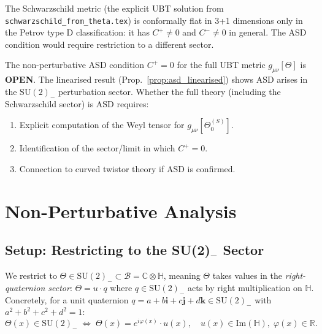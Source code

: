 \documentclass[11pt,a4paper]{article}
\theoremstyle{definition}
\theoremstyle{remark}
\begin{document}
The Schwarzschild metric (the explicit UBT solution from
\texttt{schwarzschild\_from\_theta.tex}) is conformally flat in 3+1
dimensions only in the Petrov type D classification: it has $C^+ \neq 0$
and $C^- \neq 0$ in general.  The ASD condition would require restriction
to a different sector.

\begin{tcolorbox}[colback=yellow!10!white,colframe=orange!75!black,
                  title={Open: Non-Perturbative ASD}]
The non-perturbative ASD condition $C^+ = 0$ for the full UBT metric
$g_{\mu\nu}[\Theta]$ is \textbf{OPEN}.  The linearised result
(Prop.~\ref{prop:asd_linearised}) shows ASD arises in the
$\mathrm{SU}(2)_-$ perturbation sector.  Whether the full theory
(including the Schwarzschild sector) is ASD requires:
\begin{enumerate}
  \item Explicit computation of the Weyl tensor for $g_{\mu\nu}[\Theta_0^{(S)}]$.
  \item Identification of the sector/limit in which $C^+ = 0$.
  \item Connection to curved twistor theory if ASD is confirmed.
\end{enumerate}
\end{tcolorbox}

\section{Non-Perturbative Analysis}
\label{sec:nonperturbative}

\subsection{Setup: Restricting to the SU(2)$_-$ Sector}

We restrict to $\Theta \in \mathrm{SU}(2)_- \subset \mathcal{B} =
\mathbb{C}\otimes\mathbb{H}$, meaning $\Theta$ takes values in the
\emph{right-quaternion sector}: $\Theta = u \cdot q$ where $q \in \mathrm{SU}(2)_-$
acts by right multiplication on $\mathbb{H}$.  Concretely, for a unit
quaternion $q = a + b\mathbf{i} + c\mathbf{j} + d\mathbf{k} \in \mathrm{SU}(2)_-$
with $a^2+b^2+c^2+d^2 = 1$:
\begin{equation}
  \Theta(x) \in \mathrm{SU}(2)_-
  \;\Longleftrightarrow\;
  \Theta(x) = e^{i\varphi(x)}\cdot u(x),
  \quad u(x) \in \mathrm{Im}(\mathbb{H}),\; \varphi(x) \in \mathbb{R}.
  \label{eq:theta_su2}
\end{equation}
\end{document}
